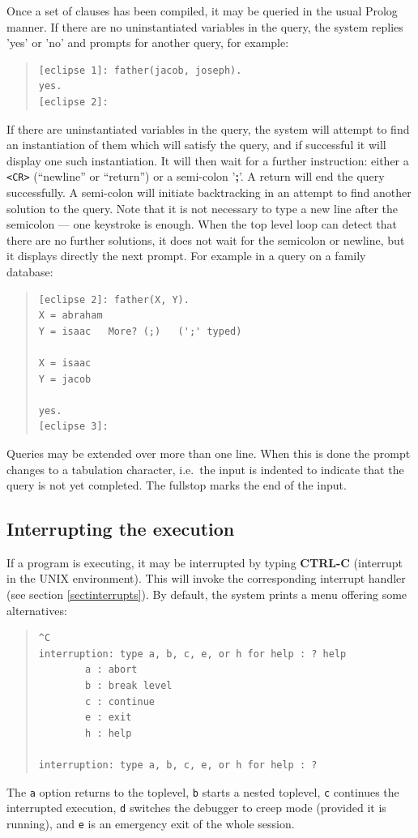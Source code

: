 Once a set of clauses has been compiled,
it may be queried in the usual Prolog manner.
If there are no uninstantiated variables in the query, the system
replies 'yes' or 'no' and prompts for another query, for example:
\begin{quote}
\begin{verbatim}
[eclipse 1]: father(jacob, joseph).
yes.
[eclipse 2]:
\end{verbatim}
\end{quote}
If there are uninstantiated variables in the query,
the system will attempt to find an instantiation of them which will
satisfy the query, and if successful it will
display one such instantiation. 
It will then wait for a further instruction: either a \verb+<CR>+
(``newline'' or ``return'') or a semi-colon '{\bf ;}'. 
A return will end the query successfully.
A semi-colon will initiate backtracking 
in an attempt to find another solution to the query.
Note that it is not necessary to type a new line after the semicolon
--- one keystroke is enough.
When the top level loop can detect
that there are no further solutions, it does not wait for the semicolon
or newline, but it displays directly the next prompt.
For example in a query on
a family database:
\begin{quote}
\begin{verbatim}
[eclipse 2]: father(X, Y).
X = abraham
Y = isaac   More? (;)   (';' typed)

X = isaac
Y = jacob

yes.
[eclipse 3]:
\end{verbatim}
\end{quote}

Queries may be extended over more than one line. When this is done the prompt
changes to a tabulation character, i.e.\ the input is indented to
indicate that the query is not yet completed.
The fullstop marks the end of the input.

\subsection{Interrupting the execution}

If a program is executing, it may be interrupted by 
typing {\bf CTRL-C} (interrupt in the UNIX environment).
This will invoke the corresponding interrupt handler
(see section \ref{sectinterrupts}).
By default, the system prints a menu offering some alternatives:
\begin{quote}
\begin{verbatim}
^C
interruption: type a, b, c, e, or h for help : ? help
        a : abort
        b : break level
        c : continue
        e : exit
        h : help

interruption: type a, b, c, e, or h for help : ? 
\end{verbatim}
\end{quote}
The {\tt a} option returns to the toplevel, {\tt b} starts a nested toplevel,
{\tt c} continues the interrupted execution, {\tt d} switches the debugger
to creep mode (provided it is running), and {\tt e} is an emergency exit
of the whole {\eclipse} session.

